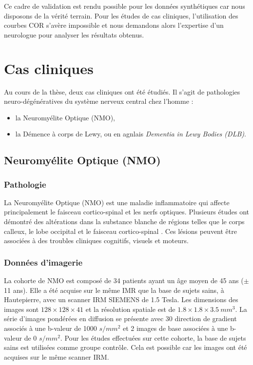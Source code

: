 Ce cadre de validation est rendu possible pour les données synthétiques car nous disposons de la vérité terrain.
Pour les études de cas cliniques, l'utilisation des courbes COR s'avère impossible 
et nous demandons alors l'expertise d'un neurologue pour analyser les résultats obtenus.


\section{Cas cliniques}
Au cours de la thèse, deux cas cliniques ont été étudiés. 
Il s'agit de pathologies neuro-dégénératives du système nerveux central chez l'homme :
\begin{itemize}
    \item la Neuromyélite Optique (NMO),
    \item la Démence à corps de Lewy, ou en agnlais \textit{Dementia in Lewy Bodies (DLB)}.
\end{itemize}


\subsection{Neuromyélite Optique (NMO)}
\subsubsection*{Pathologie}
La Neuromyélite Optique (NMO) est une maladie inflammatoire qui affecte principalement le faisceau cortico-spinal et les nerfs optiques.
Plusieurs études ont démontré des altérations dans la substance blanche de régions telles que le corps calleux, le lobe occipital et le faisceau cortico-spinal \cite{Yu2008}.
Ces lésions peuvent être associées à des troubles cliniques cognitifs, visuels et moteurs.

\subsubsection*{Données d'imagerie}
La cohorte de NMO est composé de 34 patients ayant un âge moyen de 45 ans ($\pm$ 11 ans).
Elle a été acquise sur le même IMR que la base de sujets sains, à Hautepierre, avec un scanner IRM SIEMENS de 1.5 Tesla.
Les dimensions des images sont $128\times128\times41$ et la résolution spatiale est de $1.8\times1.8\times3.5\ mm^3$.
La série d'images pondérées en diffusion se présente avec 30 direction de gradient associés à une b-valeur de 1000 $s/mm^2$
et 2 images de base associées à une b-valeur de 0 $s/mm^2$.
Pour les études effectuées sur cette cohorte, la base de sujets sains est utilisées comme groupe contrôle.
Cela est possible car les images ont été acquises sur le même scanner IRM.

